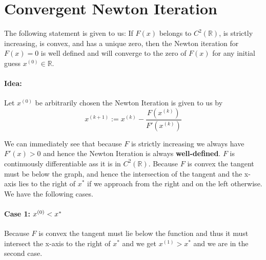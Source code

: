 \documentclass{article}
\begin{document}
\section*{Convergent Newton Iteration}
The following statement is given to us: If $F\left(x\right)$ belongs to $C^{2}\left(\mathbb{R}\right)$, is strictly increasing, is convex, and has a unique zero, then the Newton iteration for $F\left(x\right) = 0$ is well defined and will converge to the zero of $F\left(x\right)$ for any initial guess $x^{\left(0\right)} \in \mathbb{R}$. 
\paragraph{Idea: } Let $x^{\left(0\right)}$ be arbitrarily chosen the Newton Iteration is given to us by 
\begin{equation*}
    x^{\left(k+1\right)}:= x^{\left(k\right)} - \frac{F\left(x^{\left(k\right)}\right)}{F'\left(x^{\left(k\right)}\right)}
\end{equation*}

We can immediately see that because $F$ is strictly increasing we always have $F'\left(x\right) > 0$ and hence the Newton Iteration is always \textbf{well-defined}. $F$ is continuously differentiable ass it is in $C^{2}\left(\mathbb{R}\right)$. Because $F$ is convex the tangent must be below the graph, and hence the intersection of the tangent and the x-axis lies to the right of $x^{*}$ if we approach from the right and on the left otherwise. We have the following cases.

\paragraph{Case 1: $x^{\left(0\right)} < x^{*}\newline$}
Because $F$ is convex the tangent must lie below the function and thus it must intersect the x-axis to the right of $x^{*}$ and we get $x^{\left(1\right)} > x^{*}$ and we are in the second case.
\end{document}
